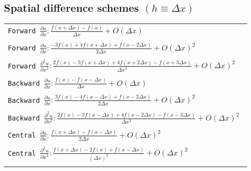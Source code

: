 \documentclass[8pt]{extarticle} %
\begin{document}
\begin{multicols*}{3}
  \subsection{Spatial difference schemes \quad $(h\equiv\Delta x)$}
  \begin{tabular}{L{2\linewidth}}
  \tt Forward $\frac{\partial u}{\partial x}: \frac{f(x+\Delta x) - f(x)}{\Delta x} + O(\Delta x)$ \\
  \\[-0.8em]
  \tt Forward $\frac{\partial u}{\partial x}: \frac{-3f(x) + 4f(x+\Delta x) + f(x-2\Delta x)}{2\Delta x} + O(\Delta x)^2$ \\
  \\[-0.8em]
  \tt Forward $\frac{\partial^2 u}{\partial x^2}: \frac{2f(x)-5f(x+\Delta x) + 4f(x+2\Delta x) - f(x+3\Delta x)}{\Delta x^3} + O(\Delta x)^2$ \\
  \\[-0.8em]
  \tt Backward $\frac{\partial u}{\partial x}: \frac{f(x) - f(x-\Delta x)}{\Delta x} + O(\Delta x)$ \\
  \\[-0.8em]
  \tt Backward $\frac{\partial u}{\partial x}: \frac{3f(x) - 4f(x-\Delta x) + f(x-2\Delta x)}{2\Delta x} + O(\Delta x)^2$ \\
  \\[-0.8em]
  \tt Backward $\frac{\partial^2 u}{\partial x^2}: \frac{2f(x)-5f(x-\Delta x) + 4f(x-2\Delta x) - f(x-3\Delta x)}{\Delta x^3} + O(\Delta x)^2$ \\
  \\[-0.8em]
  \tt Central $\frac{\partial u}{\partial x}: \frac{f(x+\Delta x) - f(x-\Delta x)}{2\Delta x} + O(\Delta x)^2$ \\
  \\[-0.8em]
  \tt Central $\frac{\partial^2 u}{\partial x^2}: \frac{f(x+\Delta x) -2f(x) + f(x-\Delta x)}{(\Delta x)^2} + O(\Delta x)^2$ \\
  \\[-0.8em]
  \end{tabular}

\end{multicols*}
\end{document}

